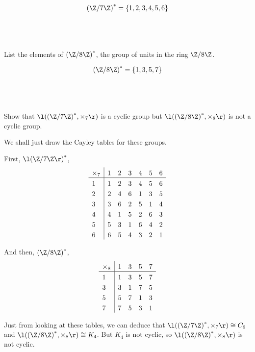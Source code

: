 \documentclass[a4paper]{article}
\begin{document}
\[ {(\Z / 7\Z)}^* = \{1, 2, 3, 4, 5, 6\} \]

\subsection{~} %

\begin{questionbody}
List the elements of ${(\Z / 8\Z)}^*$, the group of units in the ring $\Z / 8\Z$.
\end{questionbody}

\[ {(\Z / 8\Z)}^* = \{1, 3, 5, 7\} \]

\subsection{~} %

\begin{questionbody}
Show that $\l( {(\Z / 7\Z)}^*, \times_7 \r)$ is a cyclic group but $\l( {(\Z / 8\Z)}^*, \times_8 \r)$ is not a cyclic group.
\end{questionbody}

We shall just draw the Cayley tables for these groups.

First, ${\l(\Z / 7\Z\r)}^*$,
\[
\setlength{\extrarowheight}{3pt}%
\begin{array}{l|*{6}{l}} %
    \times_7 & 1 & 2 & 3 & 4 & 5 & 6 \\
\hline %
    1 & 1 & 2 & 3 & 4 & 5 & 6 \\
    2 & 2 & 4 & 6 & 1 & 3 & 5 \\
    3 & 3 & 6 & 2 & 5 & 1 & 4 \\
    4 & 4 & 1 & 5 & 2 & 6 & 3 \\
    5 & 5 & 3 & 1 & 6 & 4 & 2 \\
    6 & 6 & 5 & 4 & 3 & 2 & 1
\end{array}
\]

And then, ${(\Z / 8\Z)}^*$,
\[
\setlength{\extrarowheight}{3pt}%
\begin{array}{l|*{7}{l}} %
    \times_8 & 1 & 3 & 5 & 7 \\
\hline %
    1 & 1 & 3 & 5 & 7 \\
    3 & 3 & 1 & 7 & 5 \\
    5 & 5 & 7 & 1 & 3 \\
    7 & 7 & 5 & 3 & 1 \\
\end{array}
\]

Just from looking at these tables, we can deduce that $\l( {(\Z / 7 \Z)}^*, \times_7 \r) \cong C_6$ and $\l( {(\Z / 8 \Z)}^*, \times_8 \r) \cong K_4$. But $K_4$ is not cyclic, so $\l( {(\Z / 8 \Z)}^*, \times_8 \r)$ is not cyclic.
\end{document}

